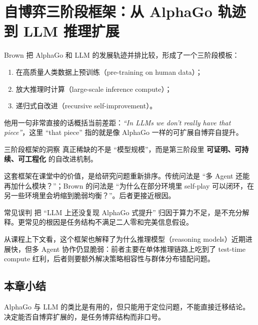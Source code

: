 \section{自博弈三阶段框架：从 AlphaGo 轨迹到 LLM 推理扩展}

Brown 把 AlphaGo 和 LLM 的发展轨迹并排比较，形成了一个三阶段模板：
\begin{enumerate}
    \item 在高质量人类数据上预训练（pre-training on human data）；
    \item 放大推理时计算（large-scale inference compute）；
    \item 递归式自改进（recursive self-improvement）。
\end{enumerate}

他用一句非常直接的话概括当前差距：\textit{``In LLMs we don't really have that piece''}，这里 ``that piece'' 指的就是像 AlphaGo 一样的可扩展自博弈自提升。

\begin{importantbox}{三阶段框架的洞察}
真正稀缺的不是 ``模型规模''，而是第三阶段里 \textbf{可证明、可持续、可工程化} 的自改进机制。
\end{importantbox}

这套框架在课堂中的价值，是给研究问题重新排序。传统问法是 ``多 Agent 还能再加什么模块？''；Brown 的问法是 ``为什么在部分环境里 self-play 可以闭环，在另一些环境里会坍缩到脆弱均衡？''。后者更接近根因。

\begin{warningbox}{常见误判}
把 ``LLM 上还没复现 AlphaGo 式提升'' 归因于算力不足，是不充分解释。更常见的根因是任务结构不满足二人零和完美信息假设。
\end{warningbox}

从课程上下文看，这个框架也解释了为什么推理模型（reasoning models）近期进展快，但多 Agent 协作仍显脆弱：前者主要在单体推理链路上吃到了 test-time compute 红利，后者则要额外解决策略相容性与群体分布错配问题。

\subsection{本章小结}
AlphaGo 与 LLM 的类比是有用的，但只能用于定位问题，不能直接迁移结论。决定能否自博弈扩展的，是任务博弈结构而非口号。

